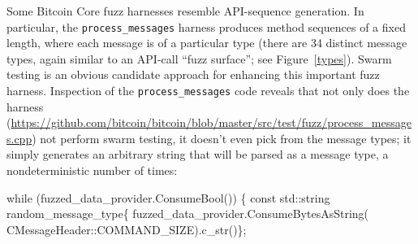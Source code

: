 Some Bitcoin Core fuzz harnesses resemble API-sequence generation.  In particular, the {\tt process\_messages} harness produces method sequences of a fixed length, where each message is of a particular type (there are  34 distinct message types, again similar to an API-call ``fuzz surface''; see Figure~\ref{types}).  Swarm testing is an obvious candidate approach for enhancing this important fuzz harness.  Inspection of the {\tt process\_messages} code reveals that not only does the harness (\url{https://github.com/bitcoin/bitcoin/blob/master/src/test/fuzz/process_messages.cpp}) not perform swarm testing, it doesn't even pick from the message types; it simply generates an arbitrary string that will be parsed as a message type, a nondeterministic number of times:

\begin{code}
while (fuzzed\_data\_provider.ConsumeBool()) \{
  const std::string random\_message\_type\{
    fuzzed\_data\_provider.ConsumeBytesAsString(
      CMessageHeader::COMMAND\_SIZE).c\_str()\};
\end{code}

